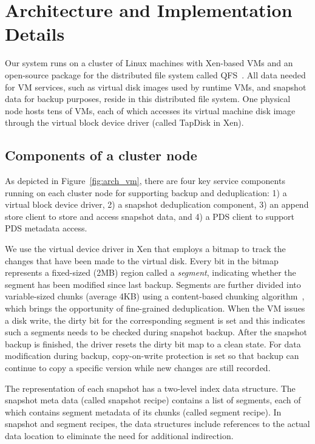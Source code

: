 \section{Architecture and Implementation Details}
\label{sect:architecture}

Our system runs on a cluster of Linux machines with Xen-based VMs and
an open-source package for the distributed file system  called QFS~\cite{michael2013}. 
All data needed for VM services, such as virtual disk images used by runtime VMs,
and snapshot data for backup purposes, reside in this distributed file system. 
One physical node hosts tens of VMs, each of which accesses its virtual machine disk image through the
virtual block device driver (called TapDisk\cite{Warfield2005} in Xen).

\subsection{ Components of a cluster node } 
As depicted in Figure~\ref{fig:arch_vm}, 
there are four key service components running on each cluster
node  for supporting backup and deduplication: 
1) a virtual block device driver, 2) a snapshot deduplication component,
3) an append store client to store  and access snapshot data,
and 4)  a PDS client to support PDS metadata access. 

We use the virtual device driver in Xen that employs a bitmap to track the changes 
that have been made to the virtual disk.
Every bit in the bitmap represents a fixed-sized (2MB) region called a \textit{segment}, indicating whether the segment
has been modified since last backup. 
Segments are further divided into variable-sized chunks (average 4KB) 
using a content-based chunking algorithm~\cite{frame05}, 
which brings the opportunity of fine-grained deduplication.
When the VM issues a disk write, the dirty bit for the corresponding segment is set
and this indicates such a segments needs to be checked during snapshot backup. 
After the snapshot backup is finished, the driver resets the dirty bit map to a clean state.
For data modification during backup, copy-on-write protection is set so that backup can continue to
copy  a specific version while new changes are still recorded.

The representation of each snapshot has  a two-level index data structure.
The snapshot meta data (called snapshot recipe) contains a list of segments, each of which contains segment
metadata of its chunks (called segment recipe).
In snapshot and segment recipes, 
the data structures  include references to the actual data location to eliminate the need for additional indirection.

